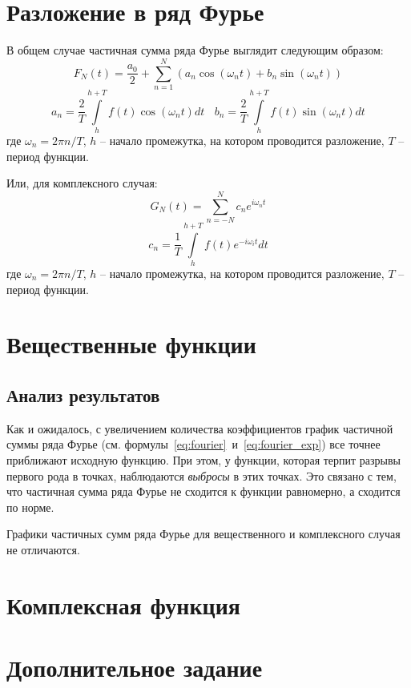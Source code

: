 \section{Разложение в ряд Фурье}

В общем случае частичная сумма ряда Фурье выглядит следующим образом: 
\begin{equation}
    F_N(t) = \frac{a_0}{2} + \sum\limits_{n=1}^{N} \left( a_n \cos(\omega_n t) + b_n \sin(\omega_n t) \right)
    \label{eq:fourier}
\end{equation}
\begin{equation}
    a_n = \frac{2}{T} \int\limits_{h}^{h + T} f(t) \cos(\omega_n t) dt ~~~~ b_n = \frac{2}{T} \int\limits_{h}^{h + T} f(t) \sin(\omega_n t) dt 
    \label{eq:fourier_coefficients}
\end{equation}
где $\omega_n = 2\pi n / T$, $h$ -- начало промежутка, на котором проводится разложение, $T$ -- период функции.

Или, для комплексного случая:
\begin{equation}
    G_N(t) = \sum\limits_{n = -N}^{N} c_n e^{i \omega_n t}
    \label{eq:fourier_exp}
\end{equation}
\begin{equation}
    c_n = \frac{1}{T}\int\limits_{h}^{h+T} f(t) e^{-i \omega_i t} dt 
    \label{eq:fourier_coefficients_exp}
\end{equation}
где $\omega_n = 2\pi n / T$,  $h$ -- начало промежутка, на котором проводится разложение, $T$ -- период функции.


\section{Вещественные функции}

\clearpage

\clearpage


\clearpage


\clearpage

\subsection{Анализ результатов}
Как и ожидалось, с увеличением количества коэффициентов график частичной суммы ряда Фурье (см. формулы~\ref{eq:fourier}~и~\ref{eq:fourier_exp}) 
все точнее приближают исходную функцию. При этом, у функции, которая терпит разрывы первого рода в точках, наблюдаются \textit{выбросы} в этих точках. 
Это связано с тем, что частичная сумма ряда Фурье не сходится к функции равномерно, а сходится по норме. 

Графики частичных сумм ряда Фурье для вещественного и комплексного случая не отличаются. 

\section{Комплексная функция}

\clearpage
\newpage

\section{Дополнительное задание}
